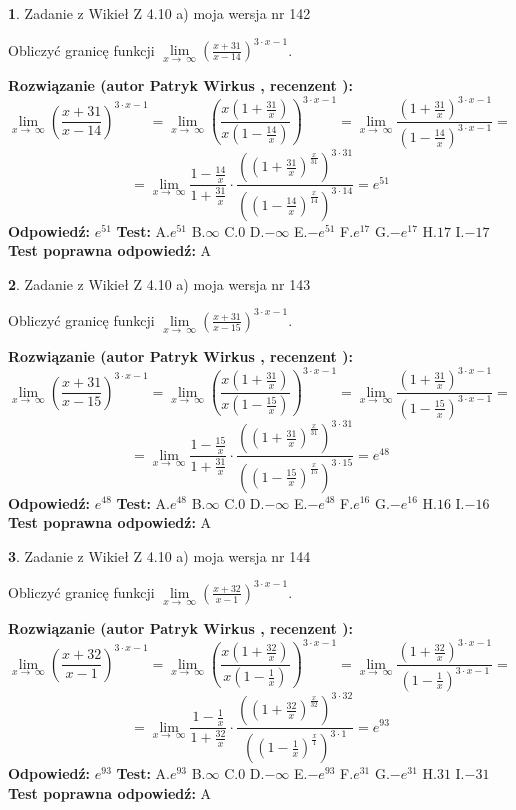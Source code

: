 \documentclass[12pt, a4paper]{article}
\theoremstyle{definition} %
\newtheorem{zad}{}
\newcommand{\zadStart}[1]{\begin{zad}#1\newline}
\newcommand{\zadStop}{\end{zad}}
\newcommand{\rozwStart}[2]{\noindent \textbf{Rozwiązanie (autor #1 , recenzent #2): }\newline}
\newcommand{\rozwStop}{\newline}
\newcommand{\odpStart}{\noindent \textbf{Odpowiedź:}\newline}
\newcommand{\odpStop}{\newline}
\newcommand{\testStart}{\noindent \textbf{Test:}\newline}
\newcommand{\testStop}{\newline}
\newcommand{\kluczStart}{\noindent \textbf{Test poprawna odpowiedź:}\newline}
\newcommand{\kluczStop}{\newline}
\begin{document}
\zadStart{Zadanie z Wikieł Z 4.10 a) moja wersja nr 142}

Obliczyć granicę funkcji  $\lim\limits_{x\to\ \infty}(\frac{x+31}{x-14})^{3\cdot x-1}$.
\zadStop
\rozwStart{Patryk Wirkus}{}
$$\lim\limits_{x\to\ \infty}(\frac{x+31}{x-14})^{3\cdot x-1} = \lim\limits_{x\to\ \infty}(\frac{x(1+\frac{31}{x})}{x(1-\frac{14}{x})})^{3\cdot x-1}=\lim\limits_{x\to\ \infty}\frac{(1+\frac{31}{x})^{3\cdot x-1}}{(1-\frac{14}{x})^{3\cdot x-1}}=$$
$$=\lim\limits_{x\to\ \infty}\frac{1-\frac{14}{x}}{1+\frac{31}{x}}\cdot\frac{((1+\frac{31}{x})^{\frac{x}{31}})^{3\cdot31}}{((1-\frac{14}{x})^{\frac{x}{14}})^{3\cdot14}}=e^{51}$$
\rozwStop
\odpStart
$e^{51}$
\odpStop
\testStart
A.$e^{51}$ B.$\infty$ C.$0$ D.$-\infty$ E.$-e^{51}$
F.$e^{17}$ G.$-e^{17}$
H.$17$
I.$-17$
\testStop
\kluczStart
A
\kluczStop



\zadStart{Zadanie z Wikieł Z 4.10 a) moja wersja nr 143}

Obliczyć granicę funkcji  $\lim\limits_{x\to\ \infty}(\frac{x+31}{x-15})^{3\cdot x-1}$.
\zadStop
\rozwStart{Patryk Wirkus}{}
$$\lim\limits_{x\to\ \infty}(\frac{x+31}{x-15})^{3\cdot x-1} = \lim\limits_{x\to\ \infty}(\frac{x(1+\frac{31}{x})}{x(1-\frac{15}{x})})^{3\cdot x-1}=\lim\limits_{x\to\ \infty}\frac{(1+\frac{31}{x})^{3\cdot x-1}}{(1-\frac{15}{x})^{3\cdot x-1}}=$$
$$=\lim\limits_{x\to\ \infty}\frac{1-\frac{15}{x}}{1+\frac{31}{x}}\cdot\frac{((1+\frac{31}{x})^{\frac{x}{31}})^{3\cdot31}}{((1-\frac{15}{x})^{\frac{x}{15}})^{3\cdot15}}=e^{48}$$
\rozwStop
\odpStart
$e^{48}$
\odpStop
\testStart
A.$e^{48}$ B.$\infty$ C.$0$ D.$-\infty$ E.$-e^{48}$
F.$e^{16}$ G.$-e^{16}$
H.$16$
I.$-16$
\testStop
\kluczStart
A
\kluczStop



\zadStart{Zadanie z Wikieł Z 4.10 a) moja wersja nr 144}

Obliczyć granicę funkcji  $\lim\limits_{x\to\ \infty}(\frac{x+32}{x-1})^{3\cdot x-1}$.
\zadStop
\rozwStart{Patryk Wirkus}{}
$$\lim\limits_{x\to\ \infty}(\frac{x+32}{x-1})^{3\cdot x-1} = \lim\limits_{x\to\ \infty}(\frac{x(1+\frac{32}{x})}{x(1-\frac{1}{x})})^{3\cdot x-1}=\lim\limits_{x\to\ \infty}\frac{(1+\frac{32}{x})^{3\cdot x-1}}{(1-\frac{1}{x})^{3\cdot x-1}}=$$
$$=\lim\limits_{x\to\ \infty}\frac{1-\frac{1}{x}}{1+\frac{32}{x}}\cdot\frac{((1+\frac{32}{x})^{\frac{x}{32}})^{3\cdot32}}{((1-\frac{1}{x})^{\frac{x}{1}})^{3\cdot1}}=e^{93}$$
\rozwStop
\odpStart
$e^{93}$
\odpStop
\testStart
A.$e^{93}$ B.$\infty$ C.$0$ D.$-\infty$ E.$-e^{93}$
F.$e^{31}$ G.$-e^{31}$
H.$31$
I.$-31$
\testStop
\kluczStart
A
\kluczStop
\end{document}
